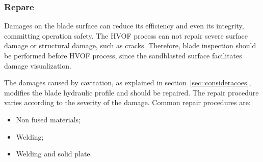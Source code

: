 \subsubsection{Repare}

Damages on the blade surface can reduce its efficiency and even its integrity,
committing operation safety. The HVOF process can not repair severe surface
damage or structural damage, such as cracks. Therefore, blade inspection should
be performed before HVOF process, since the sandblasted surface facilitates
damage visualization.

The damages caused by cavitation, as explained in
section~\ref{sec::consideracoes}, modifies the blade hydraulic profile and
should be repaired. The repair procedure varies according to the severity of
the damage. Common repair procedures are:

\begin{itemize}
  \item Non fused materials;
  \item Welding;
  \item Welding and solid plate.
\end{itemize}


